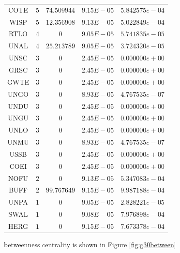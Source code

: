 \documentclass{statsoc}
\begin{document}
\begin{table}
{\begin{tabular}{*{5}{c}}
COTE  &  $5$  &  $74.509944$  &  $9.15E-05$  &  $5.842575e-04$\\
WISP  &  $5$  &  $12.356908$  &  $9.13E-05$  &  $5.022849e-04$\\
RTLO  &  $4$  &  $0$  &  $9.05E-05$  &  $5.741835e-05$\\
UNAL  &  $4$  &  $25.213789$  &  $9.05E-05$  &  $3.724320e-05$\\
UNSC  &  $3$  &  $0$  &  $2.45E-05$  &  $0.000000e+00$\\
GRSC  &  $3$  &  $0$  &  $2.45E-05$  &  $0.000000e+00$\\
GWTE  &  $3$  &  $0$  &  $2.45E-05$  &  $0.000000e+00$\\
UNGO  &  $3$  &  $0$  &  $8.93E-05$  &  $4.767535e-07$\\
UNDU  &  $3$  &  $0$  &  $2.45E-05$  &  $0.000000e+00$\\
UNGU  &  $3$  &  $0$  &  $2.45E-05$  &  $0.000000e+00$\\
UNLO  &  $3$  &  $0$  &  $2.45E-05$  &  $0.000000e+00$\\
UNMU  &  $3$  &  $0$  &  $8.93E-05$  &  $4.767535e-07$\\
USSB  &  $3$  &  $0$  &  $2.45E-05$  &  $0.000000e+00$\\
COEI  &  $3$  &  $0$  &  $2.45E-05$  &  $0.000000e+00$\\
NOFU  &  $2$  &  $0$  &  $9.13E-05$  &  $5.347083e-04$\\
BUFF  &  $2$  &  $99.767649$  &  $9.15E-05$  &  $9.987188e-04$\\
UNPA  &  $1$  &  $0$  &  $9.05E-05$  &  $2.828221e-05$\\
SWAL  &  $1$  &  $0$  &  $9.08E-05$  &  $7.976898e-04$\\
HERG  &  $1$  &  $0$  &  $9.15E-05$  &  $7.673378e-04$\\
\end{tabular}}
\end{table}



betweenness centrality is shown in Figure \ref{fig:g30between}
\end{document}

